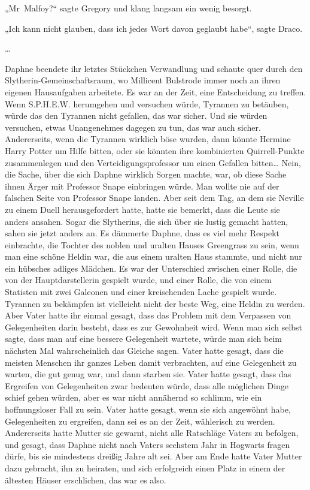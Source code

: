 {„Mr~Malfoy?“ sagte Gregory und klang langsam ein wenig besorgt.

„Ich kann nicht glauben, dass ich jedes Wort davon geglaubt habe“, sagte Draco.

…

Daphne beendete ihr letztes Stückchen Verwandlung und schaute quer durch den Slytherin-Gemeinschaftsraum, wo Millicent Bulstrode immer noch an ihren eigenen Hausaufgaben arbeitete. Es war an der Zeit, eine Entscheidung zu treffen. Wenn S.P.H.E.W. herumgehen und versuchen würde, Tyrannen zu betäuben, würde das den Tyrannen nicht gefallen, das war sicher. Und sie würden versuchen, etwas Unangenehmes dagegen zu tun, das war auch sicher. Andererseits, wenn die Tyrannen wirklich böse wurden, dann könnte Hermine Harry Potter um Hilfe bitten, oder sie könnten ihre kombinierten Quirrell-Punkte zusammenlegen und den Verteidigungsprofessor um einen Gefallen bitten… Nein, die Sache, über die sich Daphne wirklich Sorgen machte, war, ob diese Sache ihnen Ärger mit Professor Snape einbringen würde. Man wollte nie auf der falschen Seite von Professor Snape landen. Aber seit dem Tag, an dem sie Neville zu einem Duell herausgefordert hatte, hatte sie bemerkt, dass die Leute sie anders ansahen. Sogar die Slytherins, die sich über sie lustig gemacht hatten, sahen sie jetzt anders an. Es dämmerte Daphne, dass es viel mehr Respekt einbrachte, die Tochter des noblen und uralten Hauses Greengrass zu sein, wenn man eine schöne Heldin war, die aus einem uralten Haus stammte, und nicht nur ein hübsches adliges Mädchen. Es war der Unterschied zwischen einer Rolle, die von der Hauptdarstellerin gespielt wurde, und einer Rolle, die von einem Statisten mit zwei Galeonen und einer kreischenden Lache gespielt wurde. Tyrannen zu bekämpfen ist vielleicht nicht der beste Weg, eine Heldin zu werden. Aber Vater hatte ihr einmal gesagt, dass das Problem mit dem Verpassen von Gelegenheiten darin besteht, dass es zur Gewohnheit wird. Wenn man sich selbst sagte, dass man auf eine bessere Gelegenheit wartete, würde man sich beim nächsten Mal wahrscheinlich das Gleiche sagen. Vater hatte gesagt, dass die meisten Menschen ihr ganzes Leben damit verbrachten, auf eine Gelegenheit zu warten, die gut genug war, und dann starben sie. Vater hatte gesagt, dass das Ergreifen von Gelegenheiten zwar bedeuten würde, dass alle möglichen Dinge schief gehen würden, aber es war nicht annähernd so schlimm, wie ein hoffnungsloser Fall zu sein. Vater hatte gesagt, wenn sie sich angewöhnt habe, Gelegenheiten zu ergreifen, dann sei es an der Zeit, wählerisch zu werden. Andererseits hatte Mutter sie gewarnt, nicht alle Ratschläge Vaters zu befolgen, und gesagt, dass Daphne nicht nach Vaters sechstem Jahr in Hogwarts fragen dürfe, bis sie mindestens dreißig Jahre alt sei. Aber am Ende hatte Vater Mutter dazu gebracht, ihn zu heiraten, und sich erfolgreich einen Platz in einem der ältesten Häuser erschlichen, das war es also.

}
